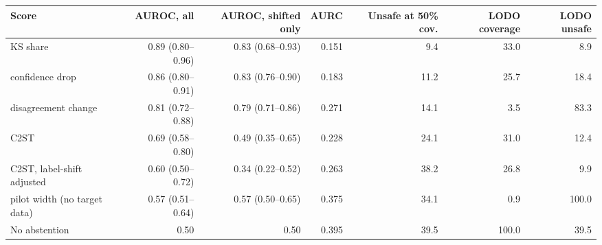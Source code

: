 \begin{tabular}{lrrrrrr}
\toprule
Score & AUROC, all & AUROC, shifted only & AURC & Unsafe at 50\% cov. & LODO coverage & LODO unsafe \\
\midrule
KS share & 0.89 (0.80--0.96) & 0.83 (0.68--0.93) & 0.151 & 9.4 & 33.0 & 8.9 \\
confidence drop & 0.86 (0.80--0.91) & 0.83 (0.76--0.90) & 0.183 & 11.2 & 25.7 & 18.4 \\
disagreement change & 0.81 (0.72--0.88) & 0.79 (0.71--0.86) & 0.271 & 14.1 & 3.5 & 83.3 \\
C2ST & 0.69 (0.58--0.80) & 0.49 (0.35--0.65) & 0.228 & 24.1 & 31.0 & 12.4 \\
C2ST, label-shift adjusted & 0.60 (0.50--0.72) & 0.34 (0.22--0.52) & 0.263 & 38.2 & 26.8 & 9.9 \\
pilot width (no target data) & 0.57 (0.51--0.64) & 0.57 (0.50--0.65) & 0.375 & 34.1 & 0.9 & 100.0 \\
\midrule
No abstention & 0.50 & 0.50 & 0.395 & 39.5 & 100.0 & 39.5 \\
\bottomrule
\end{tabular}
